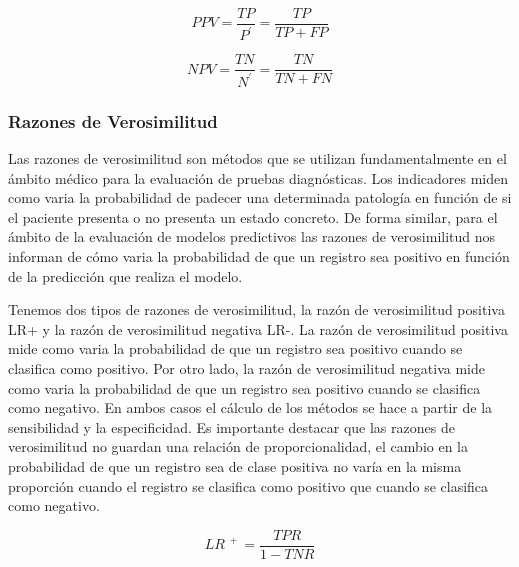 \bigbreak

\begin{equation}
    PPV = \frac{TP}{P^{\prime}} = \frac{TP}{TP+FP}
    \label{eq:PPV}
\end{equation}

\bigbreak

\begin{equation}
    NPV = \frac{TN}{N^{\prime}} = \frac{TN}{TN+FN}
    \label{eq:NPV}
\end{equation}


\subsubsection{Razones de Verosimilitud}

Las razones de verosimilitud son métodos que se utilizan fundamentalmente en el ámbito médico para la evaluación de pruebas diagnósticas. Los indicadores miden como varia la probabilidad de padecer una determinada patología en función de si el paciente presenta o no presenta un estado concreto. De forma similar, para el ámbito de la evaluación de modelos predictivos las razones de verosimilitud nos informan de cómo varia la probabilidad de que un registro sea positivo en función de la predicción que realiza el modelo.

\bigbreak

Tenemos dos tipos de razones de verosimilitud, la razón de verosimilitud positiva LR+ y la razón de verosimilitud negativa LR-. La razón de verosimilitud positiva mide como varia la probabilidad de que un registro sea positivo cuando se clasifica como positivo. Por otro lado, la razón de verosimilitud negativa mide como varia la probabilidad de que un registro sea positivo cuando se clasifica como negativo. En ambos casos el cálculo de los métodos se hace a partir de la sensibilidad y la especificidad. Es importante destacar que las razones de verosimilitud no guardan una relación de proporcionalidad, el cambio en la probabilidad de que un registro sea de clase positiva no varía en la misma proporción cuando el registro se clasifica como positivo que cuando se clasifica como negativo.

\bigbreak

\begin{equation}
    LR^{\phantom{.}+}    = \frac{TPR}{1-TNR}
    \label{eq:LR+}   
\end{equation}

